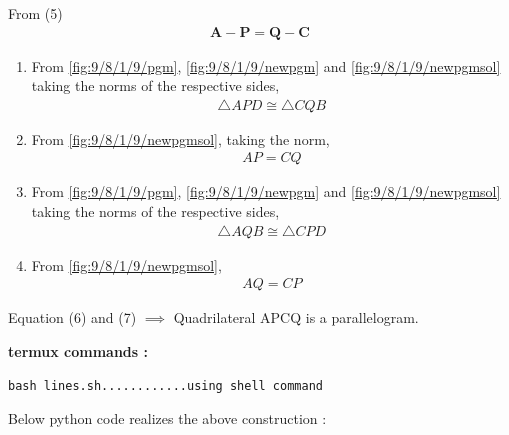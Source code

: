 \documentclass[10pt, a4paper]{article}
\let\vec\mathbf
\begin{document}
From (5)
\fi
\begin{align}
    \vec{A}-\vec{P} =\vec{Q}-\vec{C}
		\label{fig:9/8/1/9/newpgmsol}
\end{align}


\begin{enumerate}
    \item From 
		\eqref{fig:9/8/1/9/pgm}, 
		\eqref{fig:9/8/1/9/newpgm}
		and 
		\eqref{fig:9/8/1/9/newpgmsol}
		taking the norms of the respective sides, 
    \begin{align}
        \triangle APD \cong \triangle CQB
    \end{align}
    
    \item From 
		\eqref{fig:9/8/1/9/newpgmsol}, taking the norm,
	    \begin{align}
AP=CQ
    \end{align}
    
    \item From 
		\eqref{fig:9/8/1/9/pgm}, 
		\eqref{fig:9/8/1/9/newpgm}
		and 
		\eqref{fig:9/8/1/9/newpgmsol}
		taking the norms of the respective sides, 
    \begin{align}
        \triangle AQB \cong \triangle CPD
    \end{align}

    \item From 
		\eqref{fig:9/8/1/9/newpgmsol}, 
	    \begin{align}
AQ=CP
    \end{align}
\end{enumerate}

\iffalse
     \item Equation (6) and (7) 
      $\implies$  Quadrilateral APCQ is a parallelogram.


\textbf{termux commands :}
\begin{lstlisting}
bash lines.sh............using shell command
\end{lstlisting}
\begin{center}
Below python code realizes the above construction :
\end{center}
\end{document}
